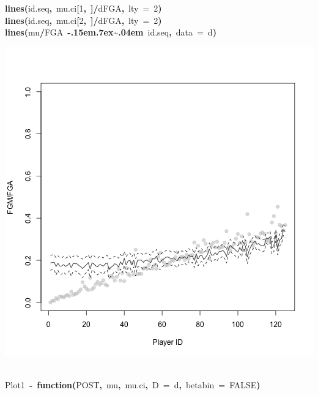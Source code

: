 \documentclass{article}
\makeatletter
\newcommand{\hlnumber}[1]{\textcolor[rgb]{0,0,0}{#1}}%
\newcommand{\hlfunctioncall}[1]{\textcolor[rgb]{.5,0,.33}{\textbf{#1}}}%
\newcommand{\hlkeyword}[1]{\textbf{#1}}%
\newcommand{\hlargument}[1]{\textcolor[rgb]{.69,.25,.02}{#1}}%
\newcommand{\hlformalargs}[1]{\hlargument{#1}}%
\newcommand{\hleqformalargs}[1]{\hlargument{#1}}%
\newcommand{\hlassignement}[1]{\textbf{#1}}%
\newcommand{\hlsymbol}[1]{#1}%
\def\urltilda{\kern -.15em\lower .7ex\hbox{\~{}}\kern .04em}%
\newcommand{\hlstd}[1]{\textcolor[rgb]{0,0,0}{#1}}%
\newenvironment{kframe}{%
 \def\FrameCommand##1{\hskip\@totalleftmargin \hskip-\fboxsep
 \colorbox{shadecolor}{##1}\hskip-\fboxsep
     \hskip-\linewidth \hskip-\@totalleftmargin \hskip\columnwidth}%
 \MakeFramed {\advance\hsize-\width
   \@totalleftmargin\z@ \linewidth\hsize
   \@setminipage}}%
 {\par\unskip\endMakeFramed}
\newenvironment{knitrout}{}{} %
\makeatother
\begin{document}
\begin{knitrout}
{\begin{kframe}
\begin{flushleft}
\hlstd{}\hlfunctioncall{lines}\hlkeyword{(}\hlsymbol{id.seq}\hlkeyword{,}{\ }\hlsymbol{mu.ci}\hlkeyword{[}\hlnumber{1}\hlkeyword{,}{\ }\hlkeyword{]}\hlkeyword{/}\hlsymbol{d}\hlkeyword{\usebox{\hlnormalsizeboxdollar}}\hlsymbol{FGA}\hlkeyword{,}{\ }\hlargument{lty}{\ }\hlargument{=}{\ }\hlnumber{2}\hlkeyword{)}\hspace*{\fill}\\
\hlstd{}\hlfunctioncall{lines}\hlkeyword{(}\hlsymbol{id.seq}\hlkeyword{,}{\ }\hlsymbol{mu.ci}\hlkeyword{[}\hlnumber{2}\hlkeyword{,}{\ }\hlkeyword{]}\hlkeyword{/}\hlsymbol{d}\hlkeyword{\usebox{\hlnormalsizeboxdollar}}\hlsymbol{FGA}\hlkeyword{,}{\ }\hlargument{lty}{\ }\hlargument{=}{\ }\hlnumber{2}\hlkeyword{)}\hspace*{\fill}\\
\hlstd{}\hlfunctioncall{lines}\hlkeyword{(}\hlsymbol{mu}\hlkeyword{/}\hlsymbol{FGA}{\ }\hlkeyword{\urltilda{}}{\ }\hlsymbol{id.seq}\hlkeyword{,}{\ }\hlargument{data}{\ }\hlargument{=}{\ }\hlsymbol{d}\hlkeyword{)}\mbox{}
\normalfont
\end{flushleft}
\includegraphics{post-bs-w-pred1} \begin{flushleft}
\ttfamily\noindent
\hspace*{\fill}\\
\hlstd{}\hlsymbol{Plot1}{\ }\hlassignement{\usebox{\hlnormalsizeboxlessthan}-}{\ }\hlkeyword{function}\hlkeyword{(}\hlformalargs{POST}\hlkeyword{,}{\ }\hlformalargs{mu}\hlkeyword{,}{\ }\hlformalargs{mu.ci}\hlkeyword{,}{\ }\hlformalargs{D}{\ }\hleqformalargs{=}{\ }\hlsymbol{d}\hlkeyword{,}{\ }\hlformalargs{betabin}{\ }\hleqformalargs{=}{\ }\hlnumber{FALSE}\hlkeyword{)}{\ }\hlkeyword{\usebox{\hlnormalsizeboxopenbrace}}\hspace*{\fill}\\

\end{flushleft}
\end{kframe}}
\end{knitrout}
\end{document}
